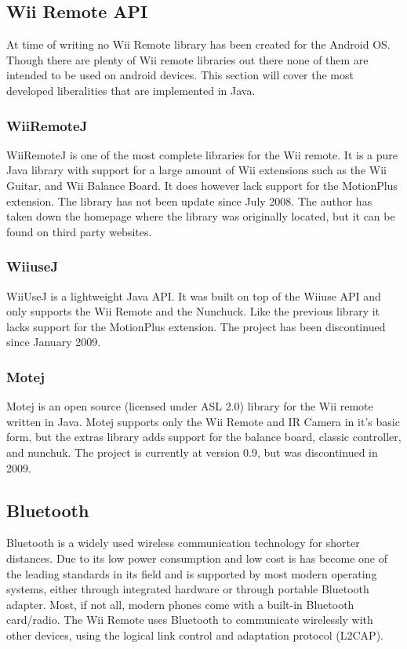 \documentclass[11pt,twoside,a4paper]{report}
\begin{document}

\subsection{Wii Remote API}
At time of writing no Wii Remote library has been created for the Android OS. Though there are plenty of Wii remote libraries out there none of them are intended to be used on android devices. This section will cover the most developed liberalities that are implemented in Java.

\subsubsection{WiiRemoteJ}
WiiRemoteJ is one of the most complete libraries for the Wii remote. It is a pure Java library with support for a large amount of Wii extensions such as the Wii Guitar, and Wii Balance Board. It does however lack support for the MotionPlus extension. The library has not been update since July 2008. The author has taken down the homepage where the library was originally located, but it can be found on third party websites. \cite{WiiRemoteJ}

\subsubsection{WiiuseJ}
WiiUseJ is a lightweight Java API. It was built on top of the Wiiuse API and only supports the Wii Remote and the Nunchuck. Like the previous library it lacks support for the MotionPlus extension. The project has been discontinued since January 2009. \cite{Wiiusej}

\subsubsection{Motej}
Motej is an open source (licensed under ASL 2.0) library for the Wii remote written in Java. Motej supports only the Wii Remote and IR Camera in it's basic form, but the extras library adds support for the balance board, classic controller, and nunchuk. The project is currently at version 0.9, but was discontinued in 2009. \cite{Motej}

\subsection{Bluetooth}
Bluetooth is a widely used wireless communication technology for shorter distances. Due to its low power consumption and low cost is has become one of the leading standards in its field and is supported by most modern operating systems, either through integrated hardware or through portable Bluetooth adapter. Most, if not all, modern phones come with a built-in Bluetooth card/radio. %
The Wii Remote uses Bluetooth to communicate wirelessly with other devices, using the logical link control and adaptation protocol (L2CAP). 
\end{document}
